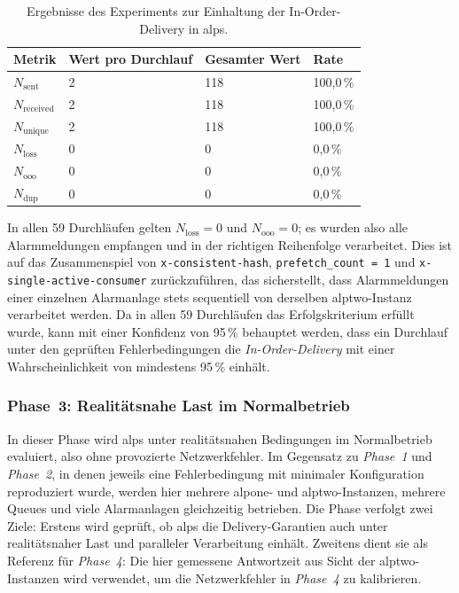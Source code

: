 \begin{table}[H]
    \centering
    \caption{Ergebnisse des Experiments zur Einhaltung der In-Order-Delivery in \acrshort{alps}.}
    \label{tab:exp-alps-iod-results}
    \begin{tabular}{|l|l|l|l|}
        \hline
        \textbf{Metrik}       & \textbf{Wert pro Durchlauf} & \textbf{Gesamter Wert} & \textbf{Rate} \\
        \hline
        $N_{\text{sent}}$     & 2                           & 118                    & 100{,}0\,\%   \\
        $N_{\text{received}}$ & 2                           & 118                    & 100{,}0\,\%   \\
        $N_{\text{unique}}$   & 2                           & 118                    & 100{,}0\,\%   \\
        $N_{\text{loss}}$     & 0                           & 0                      & 0{,}0\,\%     \\
        $N_{\text{ooo}}$      & 0                           & 0                      & 0{,}0\,\%     \\
        $N_{\text{dup}}$      & 0                           & 0                      & 0{,}0\,\%     \\
        \hline
    \end{tabular}
\end{table}

In allen 59 Durchläufen gelten $N_{\text{loss}} = 0$ und $N_{\text{ooo}} = 0$; es wurden also alle Alarmmeldungen empfangen und in der richtigen Reihenfolge verarbeitet. Dies ist auf das Zusammenspiel von \texttt{x-consistent-hash}, \texttt{prefetch\_count = 1} und \texttt{x-single-active-\allowbreak consumer} zurückzuführen, das sicherstellt, dass Alarmmeldungen einer einzelnen Alarmanlage stets sequentiell von derselben \gls{alptwo}-Instanz verarbeitet werden. Da in allen 59 Durchläufen das Erfolgskriterium erfüllt wurde, kann mit einer Konfidenz von 95\,\% behauptet werden, dass ein Durchlauf unter den geprüften Fehlerbedingungen die \textit{In-Order-Delivery} mit einer Wahrscheinlichkeit von mindestens 95\,\% einhält.

\subsubsection{Phase~3: Realitätsnahe Last im Normalbetrieb}
\label{sub-sub:exp-alps-phase-3}

In dieser Phase wird \gls{alps} unter realitätsnahen Bedingungen im Normalbetrieb evaluiert, also ohne provozierte Netzwerkfehler. Im Gegensatz zu \textit{Phase~1} und \textit{Phase~2}, in denen jeweils eine Fehlerbedingung mit minimaler Konfiguration reproduziert wurde, werden hier mehrere \gls{alpone}- und \gls{alptwo}-Instanzen, mehrere Queues und viele Alarmanlagen gleichzeitig betrieben. Die Phase verfolgt zwei Ziele: Erstens wird geprüft, ob \gls{alps} die Delivery-Garantien auch unter realitätsnaher Last und paralleler Verarbeitung einhält. Zweitens dient sie als Referenz für \textit{Phase~4}: Die hier gemessene Antwortzeit aus Sicht der \gls{alptwo}-Instanzen wird verwendet, um die Netzwerkfehler in \textit{Phase~4} zu kalibrieren.

